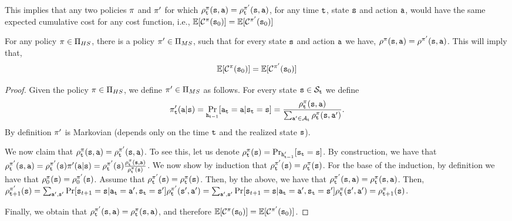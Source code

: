 This implies that any two policies $\pi$ and $\pi'$ for
which
$\rho^\pi_{\tt t}({\tt s},{\tt a})=\rho^{\pi'}_{\tt t}({\tt s},{\tt a})$,
for any time ${\tt t}$, state ${\tt s}$ and action ${\tt a}$, would
have the same expected cumulative cost for any cost function, i.e.,
$\mathbb{E}[\mathcal{C}^\pi({\tt s}_0)]=\mathbb{E}[\mathcal{C}^{\pi'}({\tt s}_0)]$



\begin{theorem}
\label{chp2:HS-MS}
For any policy $\pi\in \Pi_{HS}$, there is a policy
$\pi'\in\Pi_{MS}$, such that for every state ${\tt s}$ and action
${\tt a}$ we have,
$\rho^{\pi}({\tt s},{\tt a})=\rho^{\pi'}({\tt s},{\tt a})$.
This will imply that,
\[
\mathbb{E}[\mathcal{C}^\pi({\tt s}_0)]=\mathbb{E}[\mathcal{C}^{\pi'}({\tt s}_0)]
\]
\end{theorem}

\begin{proof}
Given the policy  $\pi\in \Pi_{HS}$, we define
$\pi'\in\Pi_{MS}$ as follows. For every state ${\tt s}\in
\mathcal{S}_{\tt t}$ we define
\[
\pi'_{\tt t}({\tt a}|{\tt s})=\Pr_{{\tt h}_{{\tt t}-1}}
[{\tt a}_{\tt t}={\tt a}|{\tt s}_{\tt t}={\tt s}]=\frac{\rho^\pi_{\tt t}({\tt s},{\tt a})}{\sum_{{\tt a}'\in
\mathcal{A}_{\tt t}} \rho^\pi_{\tt t}({\tt s},{\tt a}')}.
\]
By definition $\pi'$ is Markovian (depends only on the time
${\tt t}$ and the realized state ${\tt s}$). 

We now claim that $\rho_{\tt t}^{\pi}({\tt s},{\tt a})=\rho_{\tt t}^{\pi'}({\tt s},{\tt a})$. 
To see this, let us denote $\rho^\pi_{\tt t}({\tt s})=\Pr_{{\tt h}'_{{\tt t}-1}}
[{\tt s}_{\tt t}={\tt s}]$. By construction, we have that
$\rho_{\tt t}^{\pi'}({\tt s},{\tt a}) = \rho_{\tt t}^{\pi'}({\tt s})\pi'({\tt a}|{\tt s}) = \rho_{\tt t}^{\pi'}({\tt s}) \frac{\rho_{\tt t}^{\pi}({\tt s},{\tt a})}{\rho_{\tt t}^{\pi}({\tt s})}$. 
We now show by induction that $\rho_{\tt t}^{\pi'}({\tt s}) = {\rho_{\tt t}^{\pi}({\tt s})}$. 
For the base of the induction, by definition we have that $\rho_0^{\pi}({\tt s})=\rho_0^{\pi'}({\tt s})$. Assume that $\rho_{\tt t}^{\pi'}({\tt s}) = {\rho_{\tt t}^{\pi}({\tt s})}$. Then, by the above, we have that $\rho_{\tt t}^{\pi'}({\tt s},{\tt a})=\rho_{\tt t}^{\pi}({\tt s},{\tt a})$. Then, $\rho_{{\tt t}+1}^{\pi'}({\tt s})=\sum_{{\tt a}',{\tt s}'} \Pr
[{\tt s}_{t+1}={\tt s}|{\tt a}_{\tt t}={\tt a}',{\tt s}_{\tt t}={\tt s}']\rho_{\tt t}^{\pi'}({\tt s}',{\tt a}')=\sum_{{\tt a}',{\tt s}'} \Pr
[{\tt s}_{t+1}={\tt s}|{\tt a}_{\tt t}={\tt a}',{\tt s}_{\tt t}={\tt s}']\rho_{\tt t}^{\pi}({\tt s}',{\tt a}')=\rho_{{\tt t}+1}^{\pi}({\tt s})$.

Finally, we obtain that $\rho_{\tt t}^{\pi'}({\tt s},{\tt a}) = \rho_{\tt t}^{\pi}({\tt s},{\tt a})$, and therefore
$\mathbb{E}[\mathcal{C}^\pi({\tt s}_0)]=\mathbb{E}[\mathcal{C}^{\pi'}({\tt s}_0)]$.
\end{proof}

